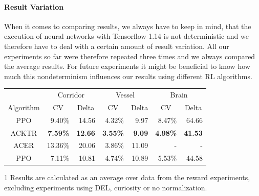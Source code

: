 \paragraph{Result Variation}
When it comes to comparing results, we always have to keep in mind, that the execution of neural networks with Tensorflow 1.14 is not deterministic and we therefore have to deal with a certain amount of result variation. All our experiments so far were therefore repeated three times and we always compared the average results. For future experiments it might be beneficial to know how much this nondeterminism influences our results using different RL algorithms.

\begin{table}[htp]
    \begin{center}
        \begin{threeparttable}
            \begin{tabular}{crrrrrr}
                \toprule
                 & \multicolumn{2}{c}{Corridor} & \multicolumn{2}{c}{Vessel} & \multicolumn{2}{c}{Brain} \\
                \cmidrule(lr){2-3} \cmidrule(lr){4-5} \cmidrule(lr){6-7}
                \multicolumn{1}{c}{Algorithm} & \multicolumn{1}{c}{CV} & \multicolumn{1}{c}{Delta} & \multicolumn{1}{c}{CV} & \multicolumn{1}{c}{Delta} & \multicolumn{1}{c}{CV} & \multicolumn{1}{c}{Delta} \\
                \midrule
                PPO & 9.40\% & 14.56 & 4.32\% & 9.97 & 8.47\% & 64.66\\
                ACKTR & \textbf{7.59\%} & \textbf{12.66} & \textbf{3.55\%} & \textbf{9.09} & \textbf{4.98\%} & \textbf{41.53} \\
                ACER & 13.36\% & 20.06 & 3.86\% & 11.09 & - & - \\
                \midrule
                PPO\tnote{1} & 7.11\% & 10.81 & 4.74\% & 10.89 & 5.53\% & 44.58 \\
                \bottomrule
            \end{tabular}
            \begin{tablenotes}
                \footnotesize
                \item[1] Results are calculated as an average over data from the reward experiments, excluding experiments using DEL, curiosity or no normalization.
            \end{tablenotes}

        \end{threeparttable}
        

\end{center}
\end{table}
